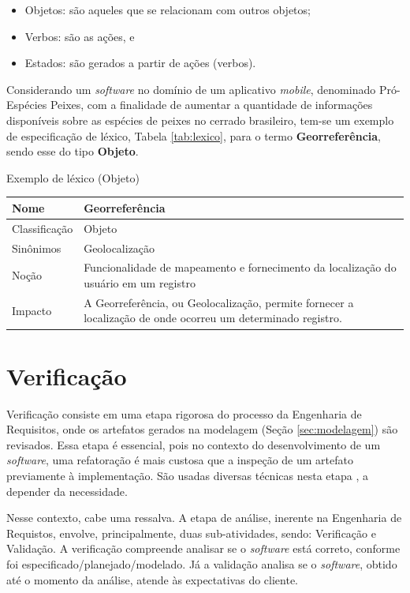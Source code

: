 \begin{itemize}
    \item Objetos: são aqueles que se relacionam com outros objetos;
    \item Verbos: são as ações, e
    \item Estados: são gerados a partir de ações (verbos).
\end{itemize}

Considerando um \textit{software} no domínio de um aplicativo \textit{mobile}, denominado Pró-Espécies Peixes, com a finalidade de aumentar a quantidade de informações disponíveis sobre as espécies de peixes no cerrado brasileiro, tem-se um exemplo de especificação de léxico, Tabela \ref{tab:lexico}, para o termo \textbf{Georreferência}, sendo esse do tipo \textbf{Objeto}.

\begin{quadro}[H]
\caption{Exemplo de léxico (Objeto)}
\centering
\begin{tabular}{L{0.15\textheight}|L{0.45\textheight}}
    \hline
    Nome & Georreferência \\ \hline
    Classificação & Objeto  \\ \hline
    Sinônimos & Geolocalização \\ \hline
    Noção & Funcionalidade de mapeamento e fornecimento da localização do usuário em um registro \\ \hline
    Impacto & A Georreferência, ou Geolocalização, permite fornecer a localização de onde ocorreu um determinado registro. \\ \hline
\end{tabular}
\label{tab:lexico}
\end{quadro}

\section {Verificação}

\label{sec:verificacao}

Verificação consiste em uma etapa rigorosa do processo da Engenharia de Requisitos, onde os artefatos gerados na modelagem (Seção \ref{sec:modelagem}) são revisados. Essa etapa é essencial, pois no contexto do desenvolvimento de um \textit{software}, uma refatoração é mais custosa que a inspeção de um artefato previamente à implementação. São usadas diversas técnicas nesta etapa \cite{verification}, a depender da necessidade.

Nesse contexto, cabe uma ressalva. A etapa de análise, inerente na Engenharia de Requistos, envolve, principalmente, duas sub-atividades, sendo: Verificação e Validação. A verificação compreende analisar  se o \textit{software} está correto, conforme foi especificado/planejado/modelado. Já a validação analisa se o \textit{software}, obtido até o momento da análise, atende às expectativas do cliente.


